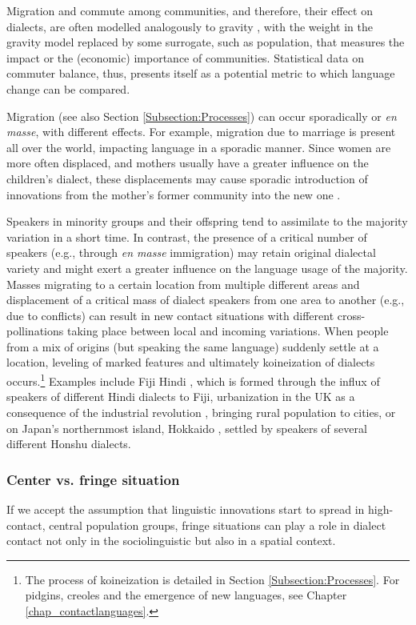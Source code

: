\documentclass[output=paper]{langscibook}
\begin{document}
Migration and commute among communities, and therefore, their effect on dialects, are often modelled analogously to gravity \parencite{Trudgill1974}, with the weight in the gravity model replaced by some surrogate, such as population, that measures the impact or the (economic) importance of communities. Statistical data on commuter balance, thus, presents itself as a potential metric to which language change can be compared.

Migration (see also Section \ref{Subsection:Processes}) can occur sporadically or \textit{en masse}, with different effects. For example, migration due to marriage is present all over the world, impacting language in a sporadic manner. Since women are more often displaced, and mothers usually have a greater influence on the children’s dialect, these displacements may cause  sporadic introduction of innovations from the mother’s former community into the new one  \parencite[e.g., ][]{Stanford2012}.

Speakers in minority groups and their offspring tend to assimilate to the majority variation in a short time.
In contrast, the presence of a critical number of speakers (e.g., through \textit{en masse} immigration) may retain original dialectal variety \parencite[22]{Fishman1966} and might exert a greater influence on the language usage of the majority. Masses migrating to a certain location from multiple different areas and displacement of a critical mass of dialect speakers from one area to another (e.g., due to conflicts) can result in new contact situations with different cross-pollinations taking place between local and incoming variations. When people from a mix of origins (but speaking the same language) suddenly settle at a location, leveling of marked features and ultimately koineization of dialects occurs.\footnote{The process of koineization is detailed in Section \ref{Subsection:Processes}. For pidgins, creoles and the emergence of new languages, see Chapter \ref{chap_contactlanguages}.} Examples include Fiji Hindi \parencite[][]{Kerswill2003}, which is formed through the influx of speakers of different Hindi dialects to Fiji, urbanization in the UK as a consequence of the industrial revolution \parencite[][]{Britain1999}, bringing rural population to cities, or on Japan's northernmost island, Hokkaido \parencite[][]{Kleander2018}, settled by speakers of  several different Honshu dialects.     

\subsubsection{Center vs. fringe situation} 
If we accept the assumption that linguistic innovations start to spread in high-contact, central population groups, fringe situations can play a role in dialect contact not only in the sociolinguistic but also in a  spatial context.
\end{document}
